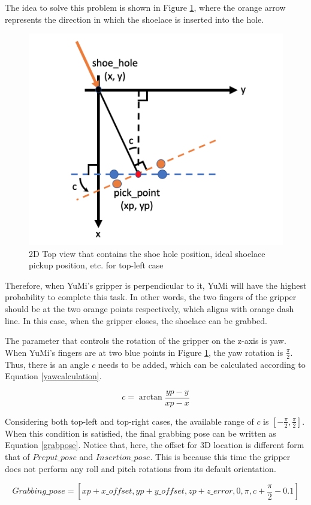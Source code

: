 The idea to solve this problem is shown in Figure \ref{lacegrab}, where the orange arrow represents the direction in which the shoelace is inserted into the hole.

\begin{figure}[H]
\centering
\includegraphics[width = 0.5\columnwidth]{Implementation/mp/lacegrab.png}
\caption{2D Top view that contains the shoe hole position, ideal shoelace pickup position, etc. for top-left case}
\label{lacegrab}
\end{figure}

Therefore, when YuMi's gripper is perpendicular to it, YuMi will have the highest probability to complete this task. In other words, the two fingers of the gripper should be at the two orange points respectively, which aligns with orange dash line. In this case, when the gripper closes, the shoelace can be grabbed. 

The parameter that controls the rotation of the gripper on the z-axis is yaw. When YuMi's fingers are at two blue points in Figure \ref{lacegrab}, the yaw rotation is $\frac{\pi}{2}$. Thus, there is an angle $c$ needs to be added, which can be calculated according to Equation \ref{yawcalculation}.

\begin{equation}
c = \arctan \frac{yp - y}{xp - x}
\label{yawcalculation}
\end{equation}

Considering both top-left and top-right cases, the available range of $c$ is $[-\frac{\pi}{2}, \frac{\pi}{2}]$. When this condition is satisfied, the final grabbing pose can be written as Equation \ref{grabpose}. Notice that, here, the offset for 3D location is different form that of $Preput\_pose$ and $Insertion\_pose$. This is because this time the gripper does not perform any roll and pitch rotations from its default orientation.

\begin{equation}
Grabbing\_pose = [xp + x\_offset, yp + y\_offset, zp + z\_error, 0, \pi, c + \frac{\pi}{2} - 0.1]
\label{grabpose}
\end{equation}

